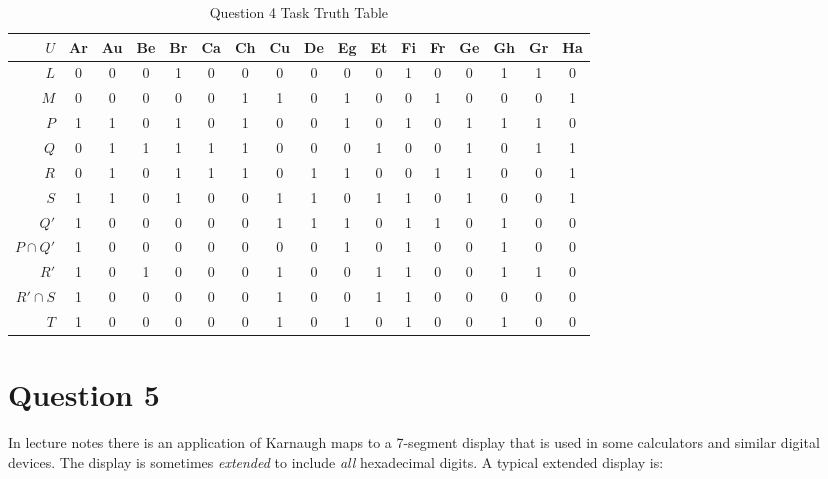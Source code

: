 \documentclass[12pt,a4paper]{article}
\begin{document}
\newpage
\begin{landscape}
\thispagestyle{fancylscape}
\begin{table}[h]
\centering
\caption{Question 4 Task Truth Table}
\begin{tabular}{r|c|c|c|c|c|c|c|c|c|c|c|c|c|c|c|c}
$U$ & Ar & Au & Be & Br & Ca & Ch & Cu & De & Eg & Et & Fi & Fr & Ge & Gh & Gr & Ha \\
\hline
$L$ & 0 & 0 & 0 & 1 & 0 & 0 & 0 & 0 & 0 & 0 & 1 & 0 & 0 & 1 & 1 & 0 \\
\hline
$M$ & 0 & 0 & 0 & 0 & 0 & 1 & 1 & 0 & 1 & 0 & 0 & 1 & 0 & 0 & 0 & 1 \\
\hline
$P$ & 1 & 1 & 0 & 1 & 0 & 1 & 0 & 0 & 1 & 0 & 1 & 0 & 1 & 1 & 1 & 0 \\
\hline
$Q$ & 0 & 1 & 1 & 1 & 1 & 1 & 0 & 0 & 0 & 1 & 0 & 0 & 1 & 0 & 1 & 1 \\
\hline
$R$ & 0 & 1 & 0 & 1 & 1 & 1 & 0 & 1 & 1 & 0 & 0 & 1 & 1 & 0 & 0 & 1 \\
\hline
$S$ & 1 & 1 & 0 & 1 & 0 & 0 & 1 & 1 & 0 & 1 & 1 & 0 & 1 & 0 & 0 & 1 \\
\hline
$Q'$ & 1 & 0 & 0 & 0 & 0 & 0 & 1 & 1 & 1 & 0 & 1 & 1 & 0 & 1 & 0 & 0 \\
\hline
$P \cap Q'$ & 1 & 0 & 0 & 0 & 0 & 0 & 0 & 0 & 1 & 0 & 1 & 0 & 0 & 1 & 0 & 0 \\
\hline
$R'$ & 1 & 0 & 1 & 0 & 0 & 0 & 1 & 0 & 0 & 1 & 1 & 0 & 0 & 1 & 1 & 0 \\
\hline
$R' \cap S$ & 1 & 0 & 0 & 0 & 0 & 0 & 1 & 0 & 0 & 1 & 1 & 0 & 0 & 0 & 0 & 0 \\
\hline
$T$ & 1 & 0 & 0 & 0 & 0 & 0 & 1 & 0 & 1 & 0 & 1 & 0 & 0 & 1 & 0 & 0 \\
\end{tabular}
\end{table}
\end{landscape}

\newpage
\section{Question 5}
In lecture notes there is an application of Karnaugh maps to a 7-segment display that is used in some calculators and similar digital devices. The display is sometimes \emph{extended} to include \emph{all} hexadecimal digits. A typical extended display is:
\end{document}
